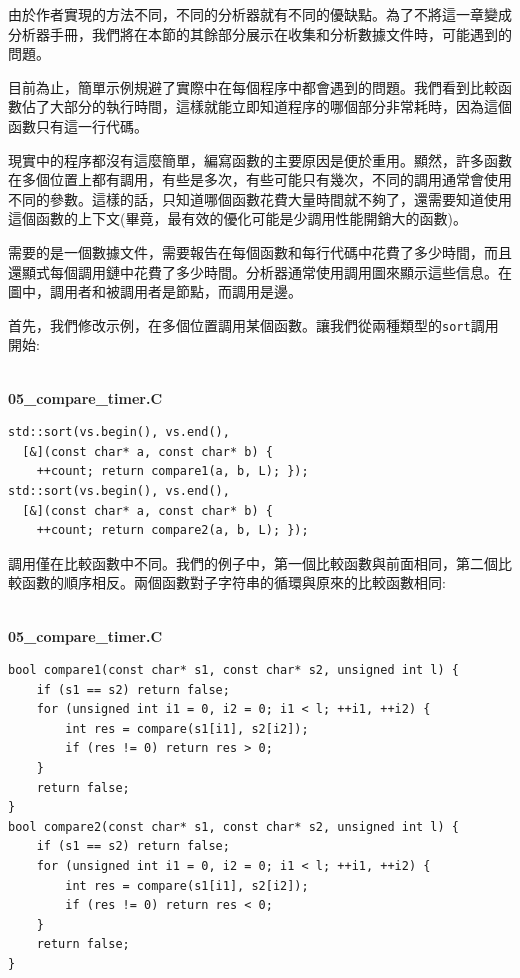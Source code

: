 由於作者實現的方法不同，不同的分析器就有不同的優缺點。為了不將這一章變成分析器手冊，我們將在本節的其餘部分展示在收集和分析數據文件時，可能遇到的問題。


目前為止，簡單示例規避了實際中在每個程序中都會遇到的問題。我們看到比較函數佔了大部分的執行時間，這樣就能立即知道程序的哪個部分非常耗時，因為這個函數只有這一行代碼。

現實中的程序都沒有這麼簡單，編寫函數的主要原因是便於重用。顯然，許多函數在多個位置上都有調用，有些是多次，有些可能只有幾次，不同的調用通常會使用不同的參數。這樣的話，只知道哪個函數花費大量時間就不夠了，還需要知道使用這個函數的上下文(畢竟，最有效的優化可能是少調用性能開銷大的函數)。

需要的是一個數據文件，需要報告在每個函數和每行代碼中花費了多少時間，而且還顯式每個調用鏈中花費了多少時間。分析器通常使用調用圖來顯示這些信息。在圖中，調用者和被調用者是節點，而調用是邊。

首先，我們修改示例，在多個位置調用某個函數。讓我們從兩種類型的\texttt{sort}調用開始:

\hspace*{\fill} \\ %
\noindent
\textbf{05\_compare\_timer.C}
\begin{lstlisting}[style=styleCXX]
std::sort(vs.begin(), vs.end(),
  [&](const char* a, const char* b) {
	++count; return compare1(a, b, L); });
std::sort(vs.begin(), vs.end(),
  [&](const char* a, const char* b) {
	++count; return compare2(a, b, L); });
\end{lstlisting}

調用僅在比較函數中不同。我們的例子中，第一個比較函數與前面相同，第二個比較函數的順序相反。兩個函數對子字符串的循環與原來的比較函數相同:

\hspace*{\fill} \\ %
\noindent
\textbf{05\_compare\_timer.C}
\begin{lstlisting}[style=styleCXX]
bool compare1(const char* s1, const char* s2, unsigned int l) {
	if (s1 == s2) return false;
	for (unsigned int i1 = 0, i2 = 0; i1 < l; ++i1, ++i2) {
		int res = compare(s1[i1], s2[i2]);
		if (res != 0) return res > 0;
	}
	return false;
}
bool compare2(const char* s1, const char* s2, unsigned int l) {
	if (s1 == s2) return false;
	for (unsigned int i1 = 0, i2 = 0; i1 < l; ++i1, ++i2) {
		int res = compare(s1[i1], s2[i2]);
		if (res != 0) return res < 0;
	}
	return false;
}
\end{lstlisting}

